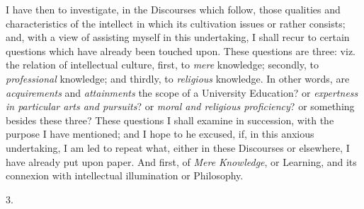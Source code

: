 I have then to investigate, in the Discourses which follow, those
qualities and characteristics of the intellect in which its
cultivation issues or rather consists; and, with a view of assisting
myself in this undertaking, I shall recur to certain questions which
have already been touched upon. These questions are three: viz. the
relation of intellectual culture, first, to \emph{mere} knowledge;
secondly, to \emph{professional} knowledge; and thirdly, to \emph{religious}
knowledge. In other words, are \emph{acquirements} and \emph{attainments}
the scope of a University Education? or \emph{expertness in particular
arts and pursuits}? or \emph{moral and religious proficiency}? or
something besides these three? These questions I shall examine in
succession, with the purpose I have mentioned; and I hope to he
excused, if, in this anxious undertaking, I am led to repeat what,
either in these Discourses or elsewhere, I have already put upon
paper. And first, of \emph{Mere Knowledge}, or Learning, and its
connexion with intellectual illumination or Philosophy.

3.

